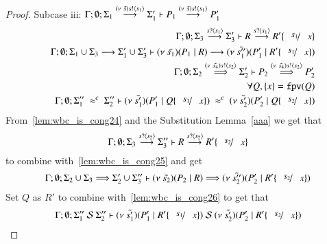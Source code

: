 \begin{proof}
	\noi Subcase iii: $\Gamma; \emptyset; \Sigma_1 \stackrel{(\nu\ \tilde{s}) s ! \langle s_1 \rangle}{\longrightarrow} \Sigma_1' \vdash P_1 \stackrel{(\nu\ \tilde{s}) s ! \langle s_1 \rangle}{\longrightarrow} P_1'$
%
	\begin{eqnarray}
		& & \Gamma; \emptyset; \Sigma_3 \by{\bactinp{s}{s_1}} \Sigma_3' \proves R \by{\bactinp{s}{s_1}} R' \subst{s_1}{x} \label{lem:wbc_is_cong24}\\
		& & \Gamma; \emptyset; \Sigma_1 \cup \Sigma_3 \by{} \Sigma_1' \cup \Sigma_3' \proves \newsp{\tilde{s_1}}{P_1 \Par R} \by{} \newsp{\tilde{s_1''}}{P_1' \Par R' \subst{s_1}{x}}\\
		& & \Gamma; \emptyset; \Sigma_2\By{\news{\tilde{s_4}} \bactout{s}{s_2}} \Sigma_2' \proves P_2 \By{\news{\tilde{s_4}} \bactout{s}{s_2}} P_2' \label{lem:wbc_is_cong25}\\
		& & \forall Q, \set{x} = \fpv{Q} \\
		& & \Gamma; \emptyset; \Sigma_1''\ \wbc\ \Sigma_2'' \proves \newsp{\tilde{s_1'}}{P_1' \Par Q \subst{s_1}{x}}\ \wbc\ \newsp{\tilde{s_2'}}{P_2' \Par Q \subst{s_2}{x}} \label{lem:wbc_is_cong26}
	\end{eqnarray}
%
	From~\ref{lem:wbc_is_cong24} and the Substitution Lemma~\ref{aaa} we get that
	\[
		\Gamma; \emptyset; \Sigma_3 \by{\bactinp{s}{s_2}} \Sigma_3'' \proves R \by{\bactinp{s}{s_2}} R' \subst{s_2}{x}
	\]
	\noi to combine with~\ref{lem:wbc_is_cong25} and get
	\[
		\Gamma; \emptyset; \Sigma_2 \cup \Sigma_3 \By{} \Sigma_2' \cup \Sigma_3'' \proves \newsp{\tilde{s_2}}{P_2 \Par R} \By{} \newsp{\tilde{s_2''}}{P_2' \Par R' \subst{s_2}{x}}
	\]
%
	\noi Set $Q$ as $R'$ to combine with~\ref{lem:wbc_is_cong26} to get that
%
	\[
		\Gamma; \emptyset; \Sigma_1''\ \mathcal{S}\ \Sigma_2'' \proves \newsp{\tilde{s_1'}}{P_1' \Par R' \subst{s_1}{x}}\ \mathcal{S}\ \newsp{\tilde{s_2'}}{P_2' \Par R' \subst{s_2}{x}}
	\]
\end{proof}


